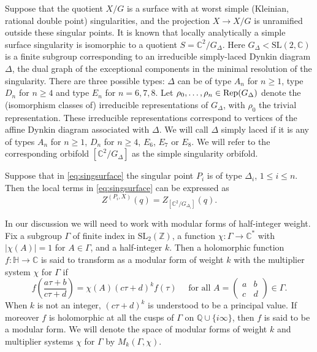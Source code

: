 \documentclass[11pt,a4paper]{amsart}
\theoremstyle{definition}
\newcommand{\SZ}{\mathbb{Z}}                    %
\newcommand{\SQ}{\mathbb{Q}}                    %
\newcommand{\SC}{\mathbb{C}}                    %
\begin{document}
Suppose that the quotient $X/G$ is a surface with at worst simple (Kleinian, rational 
double point) singularities, and the projection $ X \to X/G$ is unramified outside these singular points. 
It is known that locally analytically a simple surface singularity is isomorphic to a quotient $S=\SC^2/G_\Delta$. Here $G_\Delta<\mathrm{SL}(2,\SC)$ is a finite subgroup corresponding to an irreducible simply-laced Dynkin diagram $\Delta$, the dual graph of the
exceptional components in the minimal resolution of the singularity. There are three possible types: 
$\Delta$ can be of type $A_n$ for $n\geq 1$, type $D_n$ for $n\geq 4$ and type $E_n$ for $n=6,7,8$. 
Let $\rho_0,\ldots,\rho_n\in\mathop{\rm Rep}(G_\Delta)$ denote the (isomorphism classes of) irreducible representations of $G_\Delta$, with $\rho_0$ the trivial representation. These irreducible representations correspond to vertices of the affine Dynkin diagram associated with $\Delta$. %
We will call $\Delta$ simply laced if it is any  of types $A_n$ for $n \geq 1$, $D_n$ for $n \geq 4$, $E_6$, $E_7$ or $E_8$. We will refer to the corresponding orbifold $[\SC^2/G_\Delta]$ as the simple singularity orbifold. 

Suppose that in \eqref{eq:singsurface} the singular point $P_i$ is of type $\Delta_i$, $1 \leq i \leq n$. Then the local terms in \eqref{eq:singsurface} can be expressed as
\begin{equation} Z^{(P_i, X)}(q) = Z_{[\SC^2/G_{\Delta_i}]}(q). \label{eq:localterms} \end{equation}

In our discussion we will need to work with modular forms of half-integer weight. Fix a subgroup $\Gamma$ of finite index in $\mathrm{SL_2}(\SZ)$, a function $\chi \colon \Gamma \to \SC^{\ast}$ with $|\chi(A)|=1$ for $A \in \Gamma$, and a half-integer $k$. Then a holomorphic function $f \colon \mathbb{H} \to \SC$ is said to transform as a modular form of weight $k$ with the multiplier system $\chi$ for $\Gamma$ if
\[ f\left( \frac{a\tau+b}{c\tau+d}\right)=\chi(A)(c\tau+d)^k f(\tau) \quad \textrm{ for all } A=\begin{pmatrix}
a & b \\ c & d
\end{pmatrix} \in \Gamma. \]
When $k$ is not an integer, $(c\tau+d)^k$ is understood to be a principal value. If moreover $f$ is holomorphic at all the cusps of $\Gamma$ on $\SQ \cup \{i \infty\}$, then $f$ is said to be a modular form. We will denote the space of modular forms of weight $k$ and multiplier systems $\chi$ for $\Gamma$ by $M_k(\Gamma, \chi)$.
\end{document}
